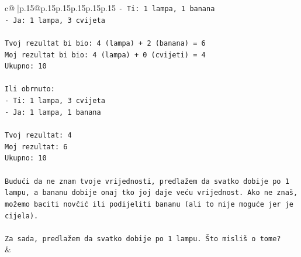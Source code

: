\documentclass{article}
\begin{document}
{\begin{supertabular}{c@{$\;$}|p{.15\linewidth}@{}p{.15\linewidth}p{.15\linewidth}p{.15\linewidth}p{.15\linewidth}p{.15\linewidth}}
{{{\texttt{{-} Ti: 1 lampa, 1 banana} \\
\texttt{{-} Ja: 1 lampa, 3 cvijeta} \\
\\ 
\texttt{Tvoj rezultat bi bio: 4 (lampa) + 2 (banana) = 6} \\
\texttt{Moj rezultat bi bio: 4 (lampa) + 0 (cvijeti) = 4} \\
\texttt{Ukupno: 10} \\
\\ 
\texttt{Ili obrnuto:} \\
\texttt{{-} Ti: 1 lampa, 3 cvijeta} \\
\texttt{{-} Ja: 1 lampa, 1 banana} \\
\\ 
\texttt{Tvoj rezultat: 4} \\
\texttt{Moj rezultat: 6} \\
\texttt{Ukupno: 10} \\
\\ 
\texttt{Budući da ne znam tvoje vrijednosti, predlažem da svatko dobije po 1 lampu, a bananu dobije onaj tko joj daje veću vrijednost. Ako ne znaš, možemo baciti novčić ili podijeliti bananu (ali to nije moguće jer je cijela).} \\
\\ 
\texttt{Za sada, predlažem da svatko dobije po 1 lampu. Što misliš o tome?} \\
            }
        }
    }
    & \\ \\


\end{supertabular}}
\end{document}
